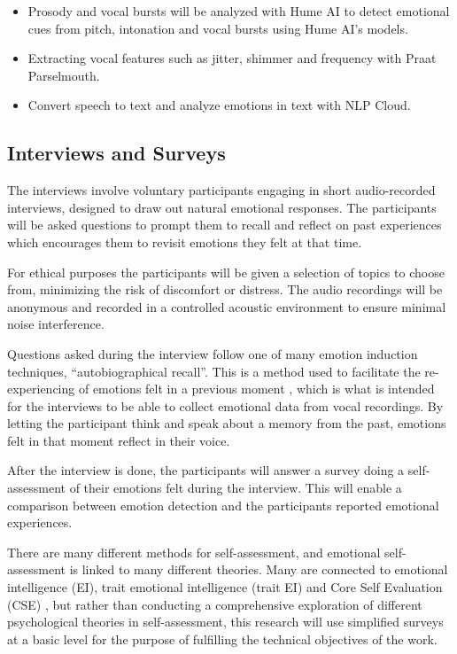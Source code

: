 \begin{itemize}
    \item Prosody and vocal bursts will be analyzed with Hume AI to detect emotional cues from pitch, intonation and vocal bursts using Hume AI’s models.
    \item Extracting vocal features such as jitter, shimmer and frequency with Praat Parselmouth.
    \item Convert speech to text and analyze emotions in text with NLP Cloud.
\end{itemize}


\subsection{Interviews and Surveys}

The interviews involve voluntary participants engaging in short audio-recorded interviews, designed to draw out natural emotional responses. The participants will be asked questions to prompt them to recall and reflect on past experiences which encourages them to revisit emotions they felt at that time. 

For ethical purposes the participants will be given a selection of topics to choose from, minimizing the risk of discomfort or distress. The audio recordings will be anonymous and recorded in a controlled acoustic environment to ensure minimal noise interference.

Questions asked during the interview follow one of many emotion induction techniques, “autobiographical recall”. This is a method used to facilitate the re-experiencing of emotions felt in a previous moment \autocite{Siedlecka2019}, which is what is intended for the interviews to be able to collect emotional data from vocal recordings. By letting the participant think and speak about a memory from the past, emotions felt in that moment reflect in their voice.

 After the interview is done, the participants will answer a survey doing a self-assessment of their emotions felt during the interview. This will enable a comparison between emotion detection and the participants reported emotional experiences.

There are many different methods for self-assessment, and emotional self-assessment is linked to many different theories. Many are connected to emotional intelligence (EI), trait emotional intelligence (trait EI) and Core Self Evaluation (CSE) \autocite{Montasem2013}, but rather than conducting a comprehensive exploration of different psychological theories in self-assessment, this research will use simplified surveys at a basic level for the purpose of fulfilling the technical objectives of the work. 

